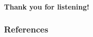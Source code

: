 \documentclass[aspectratio=169,xcolor=dvipsnames]{beamer}
\begin{document}

\begin{frame}
    \Huge{\centerline{\textbf{Thank you for listening!}}}
\end{frame}

\begin{frame}[allowframebreaks]
    \frametitle{References}
    
    {\footnotesize }
\end{frame}

\end{document}

